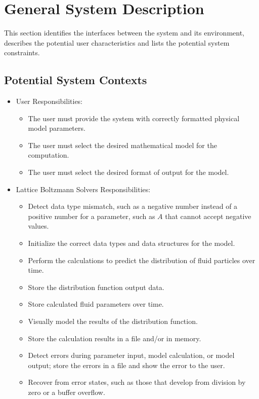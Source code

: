 \documentclass[12pt]{article}
\newcommand{\famname}{Lattice Boltzmann Solvers} %
\begin{document}
\section{General System Description}

This section identifies the interfaces between the system and its environment,
describes the potential user characteristics and lists the potential system
constraints.

\subsection{Potential System Contexts}

\begin{itemize}
\item User Responsibilities:
\begin{itemize}
\item The user must provide the system with correctly formatted physical model parameters.
\item The user must select the desired mathematical model for the computation.
\item The user must select the desired format of output for the model.
\end{itemize}
\item \famname{} Responsibilities:
\begin{itemize}
\item Detect data type mismatch, such as a negative number instead of a positive number for a parameter, such as $A$ that cannot accept negative values.
\item Initialize the correct data types and data structures for the model.
\item Perform the calculations to predict the distribution of fluid particles over time.
\item Store the distribution function output data.
\item Store calculated fluid parameters over time.
\item Visually model the results of the distribution function.
\item Store the calculation results in a file and/or in memory.
\item Detect errors during parameter input, model calculation, or model output; store the errors in a file and show the error to the user.
\item Recover from error states, such as those that develop from division by zero or a buffer overflow.
\end{itemize}
\end{itemize}
\end{document}
